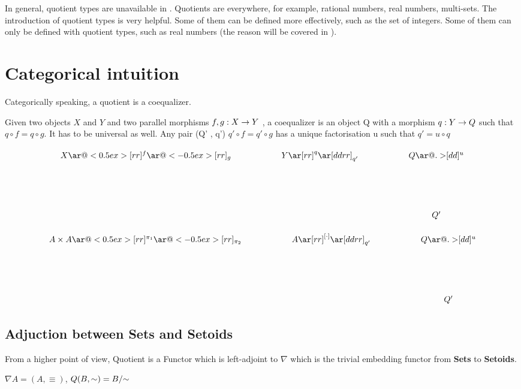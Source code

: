 In general, quotient types are unavailable in \itt.
Quotients are everywhere, for example, rational numbers, real numbers, multi-sets.
The introduction of quotient types is very helpful. Some of them can be defined 
more effectively, such as the
set of integers.
Some of them can only be defined with quotient types, such as real
numbers (the reason will be covered in \todo).

\section{Categorical intuition}

Categorically speaking, a quotient is a coequalizer.

\begin{definition}

Given two objects $X$ and $Y$ and two parallel morphisms $f, g : X \rightarrow Y$ , a coequalizer is an object Q with a morphism $q : Y \rightarrow Q$ such that $q \circ f = q \circ g$. It has to be universal as well. Any pair (Q' , q') $q' \circ f = q' \circ g$ has a unique factorisation u such that $q' = u \circ q$
\end{definition}

\begin{displaymath}
    \xymatrix{X \ar@<0.5ex>[rr]^f \ar@<-0.5ex>[rr]_g && Y \ar[rr]^q
      \ar[ddrr]_{q'} && Q
      \ar@{.>}[dd]^u \\ \\
& &&& Q' }
\end{displaymath}


\begin{displaymath}
    \xymatrix{A \times A \ar@<0.5ex>[rr]^{\pi_1} \ar@<-0.5ex>[rr]_{\pi_2} && A \ar[rr]^{[\cdot]}
      \ar[ddrr]_{q'} && Q
      \ar@{.>}[dd]^u \\ \\
& &&& Q' }
\end{displaymath}



\subsection{Adjuction between {\textbf{Sets}} and \textbf{Setoids}}

From a higher point of view, Quotient is a Functor which is left-adjoint to $\nabla$ which is the trivial embedding functor from \textbf{Sets} to \textbf{Setoids}.

\begin{definition}

$\nabla A = (A , \equiv)$, $Q (B , \sim) = \qset{B}$

\end{definition}

